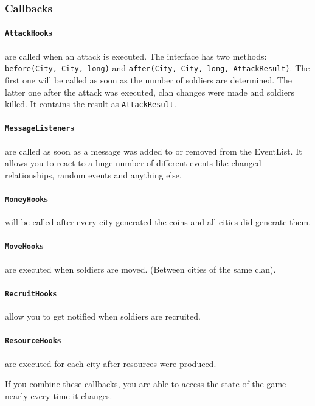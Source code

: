 \documentclass{article}
\begin{document}
    \subsubsection{Callbacks}

    \paragraph{\texttt{AttackHook}s} are called when an attack is executed.
    The interface has two methods: \texttt{before(City, City, long)} and \texttt{after(City, City, long, AttackResult)}.
    The first one will
    be called as soon as the number of soldiers are determined.
    The latter one after the attack was executed, clan changes were made and soldiers killed.
    It contains the result as \texttt{AttackResult}.

    \paragraph{\texttt{MessageListener}s} are called as soon as a message was added to or removed from the EventList.
    It allows you to react to a huge number of different events like changed relationships, random events and anything else.

    \paragraph{\texttt{MoneyHook}s} will be called after every city generated the coins and all cities did generate them.

    \paragraph{\texttt{MoveHook}s} are executed when soldiers are moved. (Between cities of the same clan).

    \paragraph{\texttt{RecruitHook}s} allow you to get notified when soldiers are recruited.

    \paragraph{\texttt{ResourceHook}s} are executed for each city after resources were produced.\newline

    If you combine these callbacks, you are able to access the state of the game nearly every time it changes.
\end{document}
